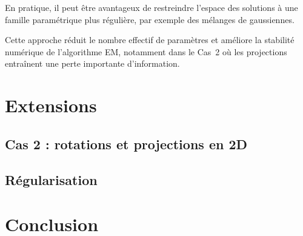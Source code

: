 \documentclass[12pt, a4paper]{article}
\theoremstyle{definition}
\begin{document}
En pratique, il peut être avantageux de restreindre l'espace des solutions à une famille paramétrique plus régulière, par exemple des mélanges de gaussiennes.

Cette approche réduit le nombre effectif de paramètres et améliore la stabilité numérique de l'algorithme EM, notamment dans le Cas~2 où les projections entraînent une perte importante d'information.
%


\newpage
\section{Extensions}
\label{sec:extensions}

\subsection{Cas 2 : rotations et projections en 2D}
\label{subsec:cas2_extensions}

\subsection{Régularisation}
\label{subsec:regularisation}


\newpage
\section*{Conclusion}


\newpage


\end{document}
